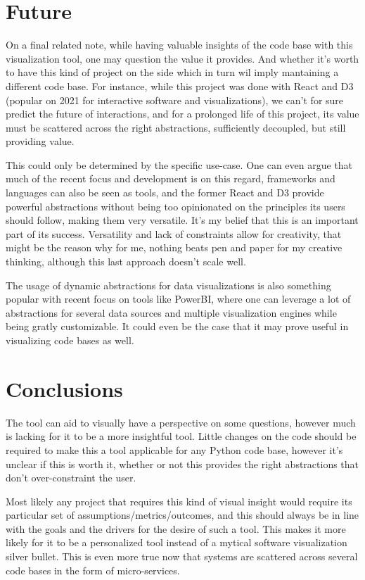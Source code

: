 \documentclass[a4paper,11pt]{article}
\begin{document}
\section{Future}
\label{sec:org3f25a1e}

On a final related note, while having valuable insights of the code base with this visualization tool, one may question the value it provides. And whether it's worth to have this kind of project on the side which in turn wil imply mantaining a different code base. For instance, while this project was done with React and D3 (popular on 2021 for interactive software and visualizations), we can't for sure predict the future of interactions, and for a prolonged life of this project, its value must be scattered across the right abstractions, sufficiently decoupled, but still providing value.

This could only be determined by the specific use-case. One can even argue that much of the recent focus and development is on this regard, frameworks and languages can also be seen as tools, and the former React and D3 provide powerful abstractions without being too opinionated on the principles its users should follow, making them very versatile. It's my belief that this is an important part of its success. Versatility and lack of constraints allow for creativity, that might be the reason why for me, nothing beats pen and paper for my creative thinking, although this last approach doesn't scale well.

The usage of dynamic abstractions for data visualizations is also something popular with recent focus on tools like PowerBI, where one can leverage a lot of abstractions for several data sources and multiple visualization engines while being gratly customizable. It could even be the case that it may prove useful in visualizing code bases as well.

\section{Conclusions}
\label{sec:org65768c3}

The tool can aid to visually have a perspective on some questions, however much is lacking for it to be a more insightful tool. Little changes on the code should be required to make this a tool applicable for any Python code base, however it's unclear if this is worth it, whether or not this provides the right abstractions that don't over-constraint the user.

Most likely any project that requires this kind of visual insight would require its particular set of assumptions/metrics/outcomes, and this should always be in line with the goals and the drivers for the desire of such a tool. This makes it more likely for it to be a personalized tool instead of a mytical software visualization silver bullet. This is even more true now that systems are scattered across several code bases in the form of micro-services.
\end{document}
